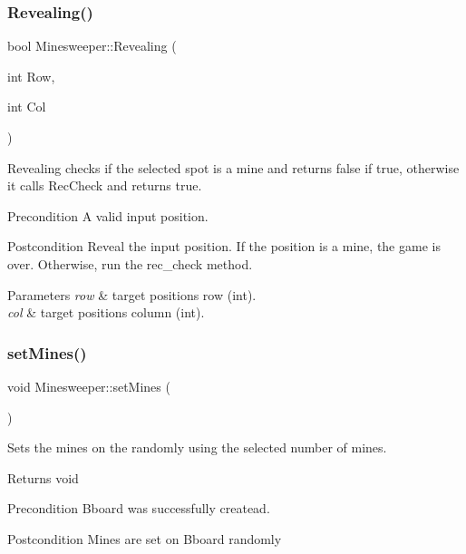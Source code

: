 \subsubsection{\texorpdfstring{Revealing()}{Revealing()}}
{\footnotesize\ttfamily bool Minesweeper\+::\+Revealing (\begin{DoxyParamCaption}\item[{int}]{Row,  }\item[{int}]{Col }\end{DoxyParamCaption})}



Revealing checks if the selected spot is a mine and returns false if true, otherwise it calls Rec\+Check and returns true. 

\begin{DoxyPrecond}{Precondition}
A valid input position. 
\end{DoxyPrecond}
\begin{DoxyPostcond}{Postcondition}
Reveal the input position. If the position is a mine, the game is over. Otherwise, run the rec\+\_\+check method. 
\end{DoxyPostcond}

\begin{DoxyParams}{Parameters}
{\em row} & target position\textquotesingle{}s row (int). \\
\hline
{\em col} & target position\textquotesingle{}s column (int). \\
\hline
\end{DoxyParams}
\mbox{\label{classMinesweeper_a3150b5ddb8317214df23b2836ef12f50}} 
\subsubsection{\texorpdfstring{set\+Mines()}{setMines()}}
{\footnotesize\ttfamily void Minesweeper\+::set\+Mines (\begin{DoxyParamCaption}{ }\end{DoxyParamCaption})\hspace{0.3cm}{\ttfamily [private]}}



Sets the mines on the randomly using the selected number of mines. 

\begin{DoxyReturn}{Returns}
void 
\end{DoxyReturn}
\begin{DoxyPrecond}{Precondition}
Bboard was successfully createad. 
\end{DoxyPrecond}
\begin{DoxyPostcond}{Postcondition}
Mines are set on Bboard randomly 
\end{DoxyPostcond}


